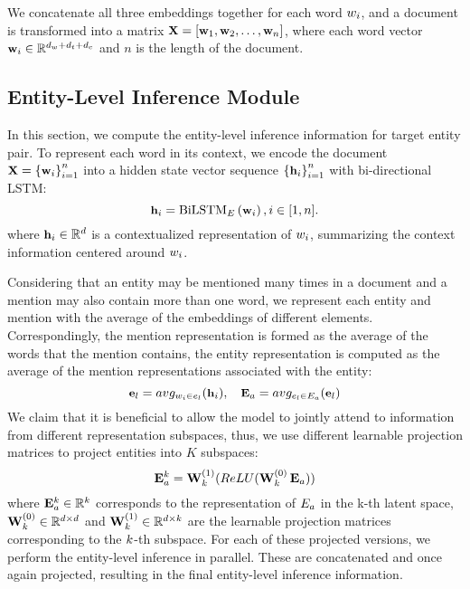 \documentclass[runningheads]{llncs}
\begin{document}
We concatenate all three embeddings together for each word $\small {w}_{i}$, and a document is transformed into a matrix $\small \textbf{X}=\left[\textbf{w}_{1}, \textbf{w}_{2}, \ldots, \textbf{w}_{{n}}\right]$, 
where each word vector $\small \textbf{w}_{i} \in \mathbb{R}^{d_{w}+ d_{t}+d_{c}}$ and $n$ is the length of the document.

\subsection{Entity-Level Inference Module}
In this section, we compute the entity-level inference information for target entity pair.
To represent each word in its context, we encode the document $\small \textbf{X}=\left\{\textbf{w}_{i}\right\}_{i=1}^{n}$ 
into a hidden state vector sequence $\small \left\{\textbf{h}_{i}\right\}_{i=1}^{n}$ with bi-directional LSTM:
\begin{equation}
\small
\textbf{h}_{i}=\mathrm{BiLSTM}_{E}\left(\textbf{w}_{i}\right), i \in[1, n].
\end{equation}
where $\small \textbf{h}_{i} \in \mathbb{R}^{d}$ is a contextualized representation of $\small w_{i}$, summarizing the context information centered around $\small w_{i}$. 

Considering that an entity may be mentioned many times in a document and a mention may also contain more than one word, we represent each entity and mention with the average of the embeddings of different elements.
Correspondingly, the mention representation is formed as the average of the words that the mention contains, the entity representation is computed as the average of the mention representations associated with the entity:
\begin{equation}
\small
\textbf{e}_{l}=avg_{w_{i}\in e_{l}}(\textbf{h}_{i}), \quad 
\textbf{E}_{a}=avg_{e_{l}\in E_{a}}(\textbf{e}_{l})
\end{equation}
We claim that it is beneficial to allow the model to jointly attend to information from different representation subspaces, thus, we use different learnable projection matrices to project entities into  $K$ subspaces:
\begin{equation}
\small
\mathbf{E}_{a}^{k}= \mathbf{W}_{k}^{(1)}(ReLU(\mathbf{W}_{k}^{(0)} \, \mathbf{E}_{a}))
\end{equation}
where $\small \mathbf{E}_{a}^{k} \in \mathbb{R}^{k}$ corresponds to the representation of $\small E_{a}$ in the k-th latent space, 
$\small \mathbf{W}_{k}^{(0)} \in \mathbb{R}^{d\times d}$ and $\small \mathbf{W}_{k}^{(1)} \in \mathbb{R}^{d\times k}$ are the learnable projection matrices corresponding to the $\small k$-th subspace.
For each of these projected versions, we perform the entity-level inference in parallel.
These are concatenated and once again projected, resulting in the final entity-level inference information.
\end{document}

